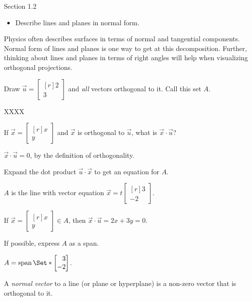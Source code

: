 \documentclass{problemset}
\DeclareMathOperator{\Span}{span}
\newcommand{\mat}[1]{\begin{bmatrix*}[r]#1\end{bmatrix*}}
\begin{document}
\begin{lesson}
	\newpage

	Section 1.2

	\begin{itemize}
		\item Describe lines and planes in normal form.
	\end{itemize}

	Physics often describes surfaces in terms of normal and tangential components.
	Normal form of lines and planes is one way to get at this decomposition. Further, thinking
	about lines and planes in terms of right angles will help when visualizing orthogonal projections.

	\newpage
\end{lesson}
	
	\question
	\begin{parts}
		\item Draw $\vec u=\mat{2\\3}$ and \emph{all} vectors orthogonal to it. 
			Call this set $A$.
			\begin{solution}
				XXXX
			\end{solution}
		\item If $\vec x=\mat{x\\y}$ and $\vec x$ is orthogonal to $\vec u$, 
			what is $\vec x\cdot \vec u$?
			\begin{solution}[inline]
				$\vec x\cdot \vec u = 0$, by the definition of orthogonality.
			\end{solution}
		\item Expand the dot product $\vec u\cdot \vec x$ to get an equation for $A$.
			\begin{solution}
				$A$ is the line with vector equation $\vec x = t\mat{3\\-2}$. 

				If $\vec x=\mat{x\\y} \in A$, then $\vec x\cdot\vec u = 2x + 3y = 0$.
			\end{solution}
		\item If possible, express $A$ as a span.
			\begin{solution}[inline]
				$A = \Span\Set*{\mat{3\\-2}}$.
			\end{solution}
	\end{parts}

	\begin{definition}
		A \emph{normal vector} to a line (or plane or hyperplane) is a non-zero vector that is orthogonal to it.
	\end{definition}
\end{document}
